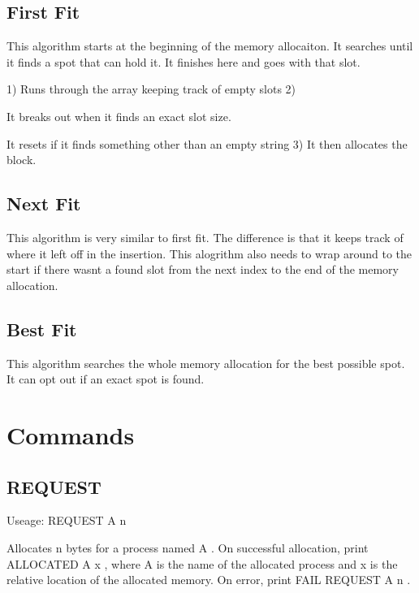\subsection*{First Fit}

This algorithm starts at the beginning of the memory allocaiton. It searches until it finds a spot that can hold it. It finishes here and goes with that slot.

1) Runs through the array keeping track of empty slots 2)
\begin{DoxyItemize}
\item It breaks out when it finds an exact slot size.
\item It resets if it finds something other than an empty string 3) It then allocates the block.
\end{DoxyItemize}

\subsection*{Next Fit}

This algorithm is very similar to first fit. The difference is that it keeps track of where it left off in the insertion. This alogrithm also needs to wrap around to the start if there wasn\textquotesingle{}t a found slot from the next index to the end of the memory allocation.

\subsection*{Best Fit}

This algorithm searches the whole memory allocation for the best possible spot. It can opt out if an exact spot is found.

\section*{Commands}

\subsection*{R\+E\+Q\+U\+E\+ST}

Useage\+: R\+E\+Q\+U\+E\+ST A n 
\begin{DoxyCode}
Allocates n bytes for a process named A . On successful allocation, print
ALLOCATED A x , where A is the name of the allocated process and x is
the relative location of the allocated memory. On error, print
FAIL REQUEST A n .
\end{DoxyCode}


